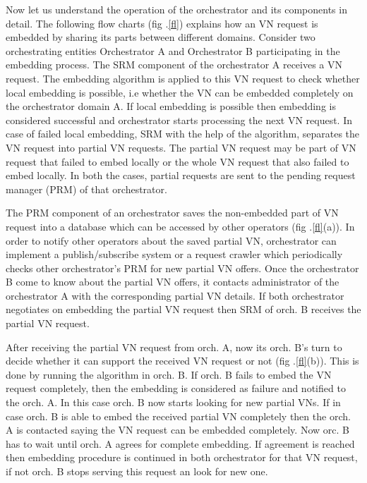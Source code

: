\documentclass[article,dr=phil,type=msc ,colorback,accentcolor=tud4b]{tudthesis}
\begin{document}
Now let us understand the operation of the orchestrator and its components in detail. The following flow charts (fig .\ref{fl}) explains how an VN request is embedded by sharing its parts between different domains. Consider two orchestrating entities Orchestrator A and Orchestrator B participating in the embedding process. The SRM component of the orchestrator A receives a VN request. The embedding algorithm is applied to this VN request to check whether local embedding is possible, i.e whether the VN can be embedded completely on the orchestrator domain A. If local embedding is possible then embedding is considered successful and orchestrator starts processing the next VN request. In case of failed local embedding, SRM with the help of the algorithm, separates the VN request into partial VN requests. The partial VN request may be part of VN request that failed to embed locally or the whole VN request that also failed to embed locally. In both the cases, partial requests are sent to the pending request manager (PRM) of that orchestrator.\newline

The PRM component of an orchestrator saves the non-embedded part of VN request into a database which can be accessed by other operators (fig .\ref{fl}(a)). In order to notify other operators about the saved partial VN, orchestrator can implement a publish/subscribe system or a request crawler which periodically checks other orchestrator's PRM for new partial VN offers. Once the orchestrator B come to know about the partial VN offers, it contacts administrator of the orchestrator A with the corresponding partial VN details. If both orchestrator negotiates on embedding the partial VN request then SRM of orch. B receives the partial VN request. 

After receiving the partial VN request from orch. A, now its orch. B's turn to decide whether it can support the received VN request or not (fig .\ref{fl}(b)). This is done by running the algorithm in orch. B. If orch. B fails to embed the VN request completely, then the embedding is considered as failure and notified to the orch. A. In this case orch. B now starts looking for new partial VNs. If in case orch. B is able to embed the received partial VN completely then the orch. A is contacted saying the VN request can be embedded completely. Now orc. B has to wait until orch. A agrees for complete embedding. If agreement is reached then embedding procedure is continued in both orchestrator for that VN request, if not orch. B stops serving this request an look for new one.
\end{document}
